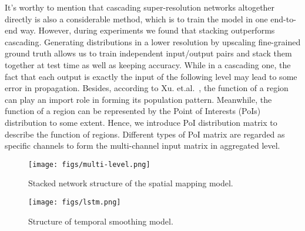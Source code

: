 \documentclass[letterpaper]{article} %
\begin{document}
It's worthy to mention that cascading super-resolution networks altogether directly is also a considerable method, which is to train the model in one end-to-end way. However, during experiments we found that stacking outperforms cascading. Generating distributions in a lower resolution by upscaling fine-grained ground truth allows us to train independent input/output pairs and stack them together at test time as well as keeping accuracy. While in a cascading one, the fact that each output is exactly the input of the following level may lead to some error in propagation\cite{Vandal2017DeepSD}.
Besides, according to Xu. et.al.~\cite{Xu2016ContextawareRP}, the function of a region can play an import role in forming its population pattern. Meanwhile, the function of a region can be represented by the Point of Interests (PoIs) distribution to some extent. Hence, we introduce PoI distribution matrix to describe the function of regions. Different types of PoI matrix are regarded as specific channels to form the multi-channel input matrix in aggregated level.


\begin{figure}[ht]
    \centering
    \texttt{[image: figs/multi-level.png]}
    \caption{Stacked network structure of the spatial mapping model.}
    \label{fig:spatial-model}
\end{figure}

\begin{figure}[ht]
    \centering
    \texttt{[image: figs/lstm.png]}
    \caption{Structure of temporal smoothing model.}
    \label{fig:lstm}
\end{figure}


\end{document}
